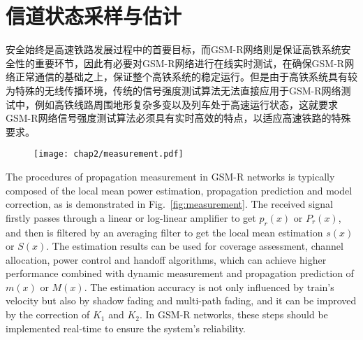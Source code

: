 

\chapter{信道状态采样与估计}
\label{chap:phy}

安全始终是高速铁路发展过程中的首要目标，而GSM-R网络则是保证高铁系统安全性的重要环节，因此有必要对GSM-R网络进行在线实时测试，在确保GSM-R网络正常通信的基础之上，保证整个高铁系统的稳定运行。但是由于高铁系统具有较为特殊的无线传播环境，传统的信号强度测试算法无法直接应用于GSM-R网络测试中，例如高铁线路周围地形复杂多变以及列车处于高速运行状态，这就要求GSM-R网络信号强度测试算法必须具有实时高效的特点，以适应高速铁路的特殊要求。

\begin{figure}[!htp]
\centering
\texttt{[image: chap2/measurement.pdf]}
\end{figure}

The procedures of propagation measurement in GSM-R networks is typically composed of the local mean power estimation, propagation prediction and model correction, as is demonstrated in Fig.~\ref{fig:measurement}. The received signal firstly passes through a linear or log-linear amplifier to get $p_r(x)$ or $P_r(x)$, and then is filtered by an averaging filter to get the local mean estimation $s(x)$ or $S(x)$. The estimation results can be used for coverage assessment, channel allocation, power control and handoff algorithms, which can achieve higher performance combined with dynamic measurement and propagation prediction of $m(x)$ or $M(x)$. The estimation accuracy is not only influenced by train's velocity but also by shadow fading and multi-path fading, and it can be improved by the correction of $K_1$ and $K_2$. In GSM-R networks, these steps should be implemented real-time to ensure the system's reliability.

\begin{figure}[!htp]
\centering
    \hspace{1cm}
\end{figure}

